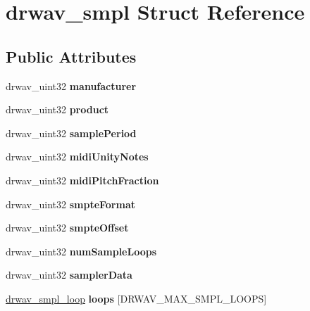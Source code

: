 \hypertarget{structdrwav__smpl}{\section{drwav\-\_\-smpl Struct Reference}
\label{structdrwav__smpl}
}
\subsection*{Public Attributes}
\begin{DoxyCompactItemize}
\item 
\hypertarget{structdrwav__smpl_a7fdc89c97102bd511d06bf2716ec0634}{drwav\-\_\-uint32 {\bfseries manufacturer}}\label{structdrwav__smpl_a7fdc89c97102bd511d06bf2716ec0634}

\item 
\hypertarget{structdrwav__smpl_aea7fc1664f91ec1637dc7f0216805302}{drwav\-\_\-uint32 {\bfseries product}}\label{structdrwav__smpl_aea7fc1664f91ec1637dc7f0216805302}

\item 
\hypertarget{structdrwav__smpl_a0172803c3912f0c49e773a85f7f518ca}{drwav\-\_\-uint32 {\bfseries sample\-Period}}\label{structdrwav__smpl_a0172803c3912f0c49e773a85f7f518ca}

\item 
\hypertarget{structdrwav__smpl_a9ccc93eeeef6c22e41f1a8ee3a5ea651}{drwav\-\_\-uint32 {\bfseries midi\-Unity\-Notes}}\label{structdrwav__smpl_a9ccc93eeeef6c22e41f1a8ee3a5ea651}

\item 
\hypertarget{structdrwav__smpl_a5544a723488dc8366aca3a88550f6934}{drwav\-\_\-uint32 {\bfseries midi\-Pitch\-Fraction}}\label{structdrwav__smpl_a5544a723488dc8366aca3a88550f6934}

\item 
\hypertarget{structdrwav__smpl_a984cf30eedef739a3eec02c5e5506096}{drwav\-\_\-uint32 {\bfseries smpte\-Format}}\label{structdrwav__smpl_a984cf30eedef739a3eec02c5e5506096}

\item 
\hypertarget{structdrwav__smpl_a6291fe764ee12e0bcfc34295f2f68b1c}{drwav\-\_\-uint32 {\bfseries smpte\-Offset}}\label{structdrwav__smpl_a6291fe764ee12e0bcfc34295f2f68b1c}

\item 
\hypertarget{structdrwav__smpl_a8d80b719a95940e83c6c7e06c2df858f}{drwav\-\_\-uint32 {\bfseries num\-Sample\-Loops}}\label{structdrwav__smpl_a8d80b719a95940e83c6c7e06c2df858f}

\item 
\hypertarget{structdrwav__smpl_a79e76e9d290dc97b2db70a86da9f9d32}{drwav\-\_\-uint32 {\bfseries sampler\-Data}}\label{structdrwav__smpl_a79e76e9d290dc97b2db70a86da9f9d32}

\item 
\hypertarget{structdrwav__smpl_af6be40ab1b9d1c2f2f4fa683462fdb8b}{\hyperlink{structdrwav__smpl__loop}{drwav\-\_\-smpl\-\_\-loop} {\bfseries loops} \mbox{[}D\-R\-W\-A\-V\-\_\-\-M\-A\-X\-\_\-\-S\-M\-P\-L\-\_\-\-L\-O\-O\-P\-S\mbox{]}}\label{structdrwav__smpl_af6be40ab1b9d1c2f2f4fa683462fdb8b}

\end{DoxyCompactItemize}


